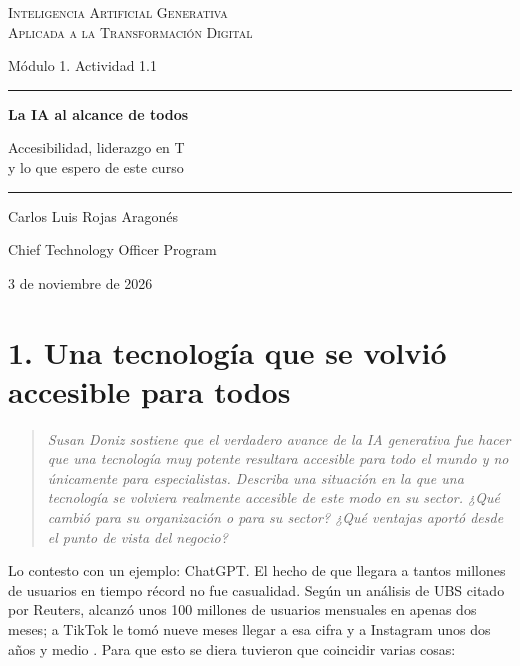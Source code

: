 \documentclass[11pt,letterpaper]{article}
\newcommand{\pregunta}[1]{%
  \begin{quote}\color{cGris}\small\itshape #1\end{quote}}
\begin{document}
\begin{titlepage}
\centering
\vspace*{3.2cm}
{\large\scshape Inteligencia Artificial Generativa\\
Aplicada a la Transformación Digital\par}
\vspace{0.5cm}
{\normalsize Módulo 1. Actividad 1.1\par}
\vspace{2.6cm}
{\color{cEje}\rule{0.55\textwidth}{0.8pt}\par}
\vspace{0.7cm}
{\LARGE\bfseries La IA al alcance de todos\par}
\vspace{0.5cm}
{\large Accesibilidad, liderazgo en T\\
y lo que espero de este curso\par}
\vspace{0.7cm}
{\color{cEje}\rule{0.55\textwidth}{0.8pt}\par}
\vfill
{\large Carlos Luis Rojas Aragonés\par}
\vspace{0.3cm}
{\normalsize Chief Technology Officer Program\par}
\vspace{0.3cm}
{\normalsize 3 de noviembre de 2026\par}
\vspace*{1.5cm}
\end{titlepage}

\section*{1. Una tecnología que se volvió accesible para todos}

\pregunta{Susan Doniz sostiene que el verdadero avance de la IA generativa fue
hacer que una tecnología muy potente resultara accesible para todo el mundo y
no únicamente para especialistas. Describa una situación en la que una
tecnología se volviera realmente accesible de este modo en su sector. ¿Qué
cambió para su organización o para su sector? ¿Qué ventajas aportó desde el
punto de vista del negocio?}

Lo contesto con un ejemplo: ChatGPT. El hecho de que llegara a tantos millones
de usuarios en tiempo récord no fue casualidad. Según un análisis de UBS
citado por Reuters, alcanzó unos 100 millones de usuarios mensuales en apenas
dos meses; a TikTok le tomó nueve meses llegar a esa cifra y a Instagram unos
dos años y medio \parencite{hu2023}. Para que esto se diera tuvieron que
coincidir varias cosas:
\end{document}
